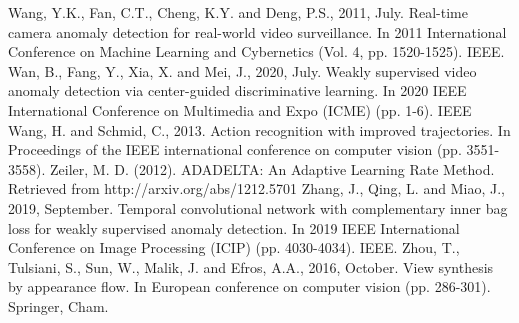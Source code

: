 \documentclass[sigplan,authorversion,nonacm, 9pt]{acmart}
\begin{document}
\begin{thebibliography}{00}
 Wang, Y.K., Fan, C.T., Cheng, K.Y. and Deng, P.S., 2011, July. Real-time camera anomaly detection for real-world video surveillance. In 2011 International Conference on Machine Learning and Cybernetics (Vol. 4, pp. 1520-1525). IEEE.
 Wan, B., Fang, Y., Xia, X. and Mei, J., 2020, July. Weakly supervised video anomaly detection via center-guided discriminative learning. In 2020 IEEE International Conference on Multimedia and Expo (ICME) (pp. 1-6). IEEE
 Wang, H. and Schmid, C., 2013. Action recognition with improved trajectories. In Proceedings of the IEEE international conference on computer vision (pp. 3551-3558).
 Zeiler, M. D. (2012). ADADELTA: An Adaptive Learning Rate Method. Retrieved from http://arxiv.org/abs/1212.5701
 Zhang, J., Qing, L. and Miao, J., 2019, September. Temporal convolutional network with complementary inner bag loss for weakly supervised anomaly detection. In 2019 IEEE International Conference on Image Processing (ICIP) (pp. 4030-4034). IEEE.
 Zhou, T., Tulsiani, S., Sun, W., Malik, J. and Efros, A.A., 2016, October. View synthesis by appearance flow. In European conference on computer vision (pp. 286-301). Springer, Cham.
\end{thebibliography}
% 
% 

\FloatBarrier
\appendix
\end{document}
